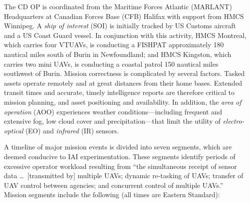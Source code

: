 The CD OP is coordinated from the Maritime Forces Atlantic (MARLANT) Headquarters at Canadian Forces Base (CFB) Halifax with support from HMCS Winnipeg. A \emph{ship of interest} (SOI) is initially tracked by US Customs aircraft and a US Coast Guard vessel. In conjunction with this activity, HMCS Montreal, which carries four VTUAVs, is conducting a FISHPAT approximately 180 nautical miles south of Burin in Newfoundland; and HMCS Kingston, which carries two mini UAVs, is conducting a coastal patrol 150 nautical miles southwest of Burin. Mission correctness is complicated by several factors. Tasked assets operate remotely and at great distances from their home bases. Extended transit times and accurate, timely intelligence reports are therefore critical to mission planning, and asset positioning and availability. In addition, the \emph{area of operation} (AOO) experiences weather conditions---including frequent and extensive fog, low cloud cover and precipitation---that limit the utility of \emph{electro-optical} (EO) and \emph{infrared} (IR) sensors.

A timeline of major mission events is divided into seven segments, which are deemed conducive to IAI experimentation. These segments identify periods of excessive operator workload resulting from ``the simultaneous receipt of sensor data \ldots\ [transmitted by] multiple UAVs; dynamic re-tasking of UAVs; transfer of UAV control between agencies; and concurrent control of multiple UAVs.''~\cite{Youngson_2004} Mission segments include the following (all times are Eastern Standard):

